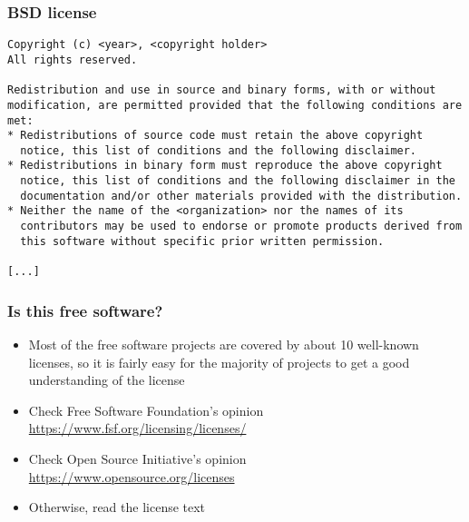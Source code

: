 \begin{frame}[fragile]
  \frametitle{BSD license}
  \begin{block}{}
  \small
  \begin{verbatim}
Copyright (c) <year>, <copyright holder>
All rights reserved.

Redistribution and use in source and binary forms, with or without
modification, are permitted provided that the following conditions are
met:
* Redistributions of source code must retain the above copyright
  notice, this list of conditions and the following disclaimer.
* Redistributions in binary form must reproduce the above copyright
  notice, this list of conditions and the following disclaimer in the
  documentation and/or other materials provided with the distribution.
* Neither the name of the <organization> nor the names of its
  contributors may be used to endorse or promote products derived from
  this software without specific prior written permission.

[...]
\end{verbatim}
  \end{block}
\end{frame}

\begin{frame}
  \frametitle{Is this free software?}
  \begin{itemize}
  \item Most of the free software projects are covered by about 10
    well-known licenses, so it is fairly easy for the majority of
    projects to get a good understanding of the license
  \item Check Free Software Foundation's opinion\\
    \url{https://www.fsf.org/licensing/licenses/}
  \item Check Open Source Initiative's opinion\\
    \url{https://www.opensource.org/licenses}
  \item Otherwise, read the license text
  \end{itemize}
\end{frame}

